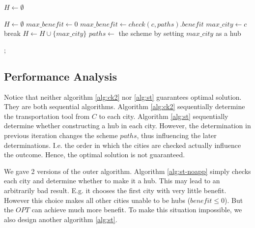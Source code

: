 \documentclass[11pt, a4paper]{article} %
\begin{document}
	\begin{algorithm}\label{alg:st-noapp}
		\caption{$Set\_up\_hubs1(S,paths)$}
		\BlankLine
		$H\leftarrow\emptyset$\;
		{
		}
		\;
	\end{algorithm}
	
	\begin{algorithm}\label{alg:st}
		\caption{$Set\_up\_hubs2(S,paths)$}
		\BlankLine
		$H\leftarrow\emptyset$\;
		{
			$max\_benefit\leftarrow 0$\;
			{
				{
					$max\_benefit\leftarrow check(c, paths).benefit$\;
					$max\_city\leftarrow c$\;
				}
			}
			{
				break\;
			}
			\Else
			{
				$H\leftarrow H\cup \{max\_city\}$\;
				$paths\leftarrow$ the scheme by setting $max\_city$ as a hub\;
			}
		}
	
		;
	\end{algorithm}
	\subsection{Performance Analysis}
	Notice that neither algorithm \ref{alg:ck2} nor \ref{alg:st} guarantees optimal solution. They are both sequential algorithms. Algorithm \ref{alg:ck2} sequentially determine the transportation tool from $C$ to each city. Algorithm \ref{alg:st} sequentially determine whether constructing a hub in each city. However, the determination in previous iteration changes the scheme $paths$, thus influencing the later determinations. I.e. the order in which the cities are checked actually influence the outcome. Hence, the optimal solution is not guaranteed.
	
	We gave 2 versions of the outer algorithm. Algorithm \ref{alg:st-noapp} simply checks each city and determine whether to make it a hub. This may lead to an arbitrarily bad result. E.g. it chooses the first city with very little benefit. However this choice makes all other cities unable to be hubs ($benefit\leq 0$). But the $OPT$ can achieve much more benefit. To make this situation impossible, we also design another algorithm \ref{alg:st}.
	
\end{document}
